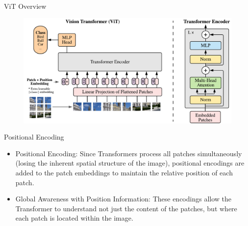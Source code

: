 \begin{frame}{ViT Overview}
    \begin{figure}
        \centering
        \includegraphics[width=0.95\linewidth]{pic/model_scheme}
        \label{fig:vit-figure}
    \end{figure}
\end{frame}

\begin{frame}{Positional Encoding}
    \begin{itemize}
        \item Positional Encoding: Since Transformers process all patches simultaneously (losing the inherent spatial structure of the image), positional encodings are added to the patch embeddings to maintain the relative position of each patch.
	    \item Global Awareness with Position Information: These encodings allow the Transformer to understand not just the content of the patches, but where each patch is located within the image.
    \end{itemize}
\end{frame}

